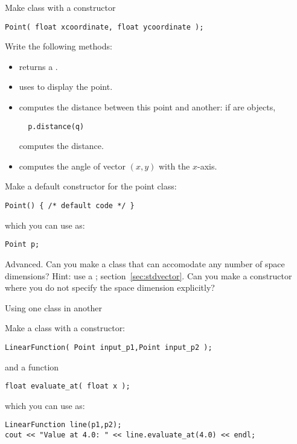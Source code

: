 \begin{exercise}
  \label{ex:geom:point}
  Make class  with a constructor
\begin{verbatim}
Point( float xcoordinate, float ycoordinate );
\end{verbatim}
Write the following methods:
\begin{itemize}
\item {} returns a .
\item  {} uses  to display the point.
\item {} computes the distance between this point and
  another: if  are  objects,
\begin{verbatim}
  p.distance(q)
\end{verbatim}
computes the distance.
\item {} computes the angle of vector $(x,y)$ with the $x$-axis.
\end{itemize}
\end{exercise}


\begin{exercise}
  Make a default constructor for the point class:
\begin{verbatim}
Point() { /* default code */ }
\end{verbatim}
  which you can use as:
\begin{verbatim}
Point p;
\end{verbatim}
\end{exercise}


\begin{exercise}
  Advanced. Can you make a  class that can accomodate any
  number of space dimensions? Hint: use a ;
  section~\ref{sec:stdvector}. Can you make a constructor where you do
  not specify the space dimension explicitly?
\end{exercise}

 {Using one class in another}
\label{sec:FuncHasPoint}
\label{sec:poly-rectangle}

\prerequisite{\ref{sec:hasa}}

\begin{exercise}
  \label{ex:geom:line}
  Make a class  with a constructor:
\begin{verbatim}
LinearFunction( Point input_p1,Point input_p2 );
\end{verbatim}
  and a function
\begin{verbatim}
float evaluate_at( float x );
\end{verbatim}
  which you can use as:
\begin{verbatim}
LinearFunction line(p1,p2);
cout << "Value at 4.0: " << line.evaluate_at(4.0) << endl;
\end{verbatim}
\end{exercise}

